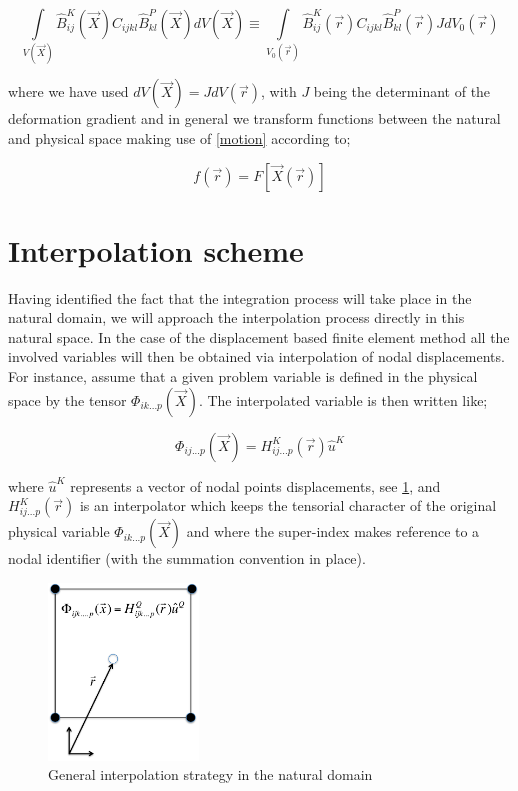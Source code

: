 \begin{equation}
\int\limits_{V(\vec{X})} \hat{B}_{ij}^K(\vec{X}) C_{ijkl} \hat{B}_{kl}^P(\vec{X}) dV(\vec{X})\equiv \int\limits_{V_0(\vec{r})} \hat{B}_{ij}^K(\vec{r}) C_{ijkl} \hat{B}_{kl}^P(\vec{r})J dV_0(\vec{r})
\label{matmatrix}
\end{equation}


where we have used $dV(\vec{X})=JdV(\vec{r})$, with $J$ being the determinant of the deformation gradient and in general we transform functions between the natural and physical space making use of \cref{motion} according to;

\begin{equation}
f(\vec{r})=F[\vec{X}(\vec{r})]
\label{funtrans}
\end{equation}

	 								
\section*{Interpolation scheme}
Having identified the fact that the integration process will take place in the natural domain, we will approach the interpolation process directly in this natural space. In the case of the displacement based finite element method all the involved variables will then be obtained via interpolation of nodal displacements. For instance, assume that a given problem variable is defined in the physical space by the tensor $\Phi_{ik...p}(\vec{X})$. The interpolated variable is then written like;

\begin{equation}
\Phi_{ij...p}(\vec{X})=H_{ij...p}^K(\vec{r})\hat{u}^K
\label{interpol}
\end{equation}	 						

where $\hat{u}^K$ represents a vector of nodal points displacements, see \cref{fig:interpol nat dom}, and $H_{ij...p}^K(\vec{r})$ is an interpolator which keeps the tensorial character of the original physical variable $\Phi_{ik...p}(\vec{X})$ and where the super-index makes reference to a nodal identifier (with the summation convention in place).


\begin{figure}[h]
\centering
\includegraphics[width=4cm]{img/figure2.pdf}
\caption{General interpolation strategy in the natural domain}
\label{fig:interpol nat dom}
\end{figure}
 


